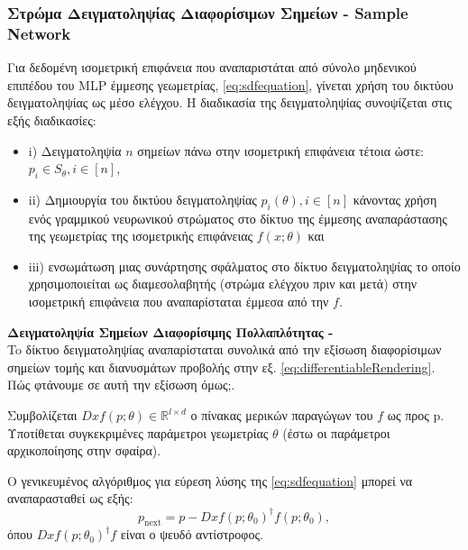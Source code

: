 \subsubsection{Στρώμα Δειγματοληψίας Διαφορίσιμων Σημείων - Sample Network}
\label{subsection:samplingnetwork}
\par
     Για δεδομένη ισομετρική επιφάνεια που αναπαριστάται από σύνολο μηδενικού επιπέδου του MLP έμμεσης γεωμετρίας, \ref{eq:sdfequation}, γίνεται χρήση του δικτύου δειγματοληψίας ως μέσο ελέγχου. Η διαδικασία της δειγματοληψίας συνοψίζεται στις εξής διαδικασίες:
    \begin{itemize}
        \item i) Δειγματοληψία $n$ σημείων πάνω στην ισομετρική επιφάνεια τέτοια ώστε: $p_i \in S_\theta, i \in [n]$,
        \item ii) Δημιουργία του δικτύου δειγματοληψίας $p_i(\theta), i \in [n]$ κάνοντας χρήση ενός γραμμικού νευρωνικού στρώματος στο δίκτυο της έμμεσης αναπαράστασης της γεωμετρίας της ισομετρικής επιφάνειας $f(x;\theta)$  και 
        \item iii) ενσωμάτωση μιας συνάρτησης σφάλματος στο δίκτυο δειγματοληψίας το οποίο χρησιμοποιείται ως διαμεσολαβητής (στρώμα ελέγχου πριν και μετά) στην ισομετρική επιφάνεια που αναπαρίσταται έμμεσα από την $f$.
    \end{itemize}
\par
    \textbf{Δειγματοληψία Σημείων Διαφορίσιμης Πολλαπλότητας - }\cite{DBLP:journals/corr/abs-1905-11911}\\
    To δίκτυο δειγματοληψίας αναπαρίσταται συνολικά από την εξίσωση διαφορίσιμων σημείων τομής και διανυσμάτων προβολής στην εξ. \ref{eq:differentiableRendering}. Πώς φτάνουμε σε αυτή την εξίσωση όμως;.

    
    Συμβολίζεται $Dxf (p; \theta) \in \mathbb{R}^{l \times d}$ ο πίνακας μερικών παραγώγων του  $f$ ως προς p. Υποτίθεται  συγκεκριμένες παράμετροι γεωμετρίας $\theta$ (έστω οι παράμετροι αρχικοποίησης στην σφαίρα).
    
    Ο γενικευμένος αλγόριθμος  \cite{ben1966newton} για εύρεση λύσης της \ref{eq:sdfequation} μπορεί να αναπαρασταθεί ως εξής:
    \begin{equation}
        p_{\text{next}} = p - Dxf (p; \theta_0)^{\dagger}f (p; \theta_0),         \label{eq:NewtonIterative}
    \end{equation}
    όπου $Dxf (p; \theta_0)^{\dagger}f $ είναι ο ψευδό αντίστροφος. 

